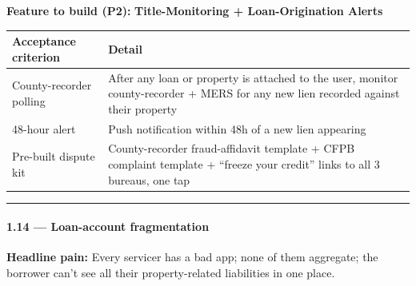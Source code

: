 \documentclass[
  10pt,
]{article}
\begin{document}
\textbf{Feature to build (P2):} \textbf{Title-Monitoring + Loan-Origination Alerts}

\begin{longtable}[]{@{}ll@{}}
\toprule
\begin{minipage}[b]{0.47\columnwidth}\raggedright
Acceptance criterion\strut
\end{minipage} & \begin{minipage}[b]{0.47\columnwidth}\raggedright
Detail\strut
\end{minipage}\tabularnewline
\midrule
\endhead
\begin{minipage}[t]{0.47\columnwidth}\raggedright
County-recorder polling\strut
\end{minipage} & \begin{minipage}[t]{0.47\columnwidth}\raggedright
After any loan or property is attached to the user, monitor county-recorder + MERS for any new lien
recorded against their property\strut
\end{minipage}\tabularnewline
\begin{minipage}[t]{0.47\columnwidth}\raggedright
48-hour alert\strut
\end{minipage} & \begin{minipage}[t]{0.47\columnwidth}\raggedright
Push notification within 48h of a new lien appearing\strut
\end{minipage}\tabularnewline
\begin{minipage}[t]{0.47\columnwidth}\raggedright
Pre-built dispute kit\strut
\end{minipage} & \begin{minipage}[t]{0.47\columnwidth}\raggedright
County-recorder fraud-affidavit template + CFPB complaint template + ``freeze your credit'' links to
all 3 bureaus, one tap\strut
\end{minipage}\tabularnewline
\bottomrule
\end{longtable}

\begin{center}\rule{0.5\linewidth}{0.5pt}\end{center}

\hypertarget{loan-account-fragmentation}{%
\paragraph{1.14 --- Loan-account fragmentation}\label{loan-account-fragmentation}}

\textbf{Headline pain:} Every servicer has a bad app; none of them aggregate; the borrower can't see
all their property-related liabilities in one place.
\end{document}
